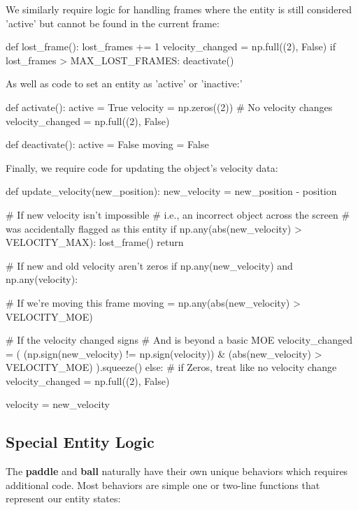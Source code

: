 \documentclass{report}
\newcommand{\pad}{\textbf{paddle}\xspace}
\newcommand{\ball}{\textbf{ball}\xspace}
\begin{document}
We similarly require logic for handling frames where the entity is still considered 'active' but cannot be found in the current frame:

\begin{codeblock}
def lost_frame():
    lost_frames += 1
    velocity_changed = np.full((2), False)
    if lost_frames > MAX_LOST_FRAMES:
        deactivate()    
\end{codeblock}

As well as code to set an entity as 'active' or 'inactive:'

\begin{codeblock}
 def activate():
    active = True
    velocity = np.zeros((2))
    # No velocity changes
    velocity_changed = np.full((2), False)   
\end{codeblock}

\begin{codeblock}
def deactivate():
    active = False
    moving = False    
\end{codeblock}

Finally, we require code for updating the object's velocity data:

\begin{codeblock}
def update_velocity(new_position):
    new_velocity = new_position - position

    # If new velocity isn't impossible
    # i.e., an incorrect object across the screen
    # was accidentally flagged as this entity
    if np.any(abs(new_velocity) > VELOCITY_MAX):
        lost_frame()
        return

    # If new and old velocity aren't zeros
    if np.any(new_velocity) and np.any(velocity):

        # If we're moving this frame
        moving = np.any(abs(new_velocity) > VELOCITY_MOE)

        # If the velocity changed signs
        # And is beyond a basic MOE
        velocity_changed = (
            (np.sign(new_velocity) != np.sign(velocity))
            & (abs(new_velocity) > VELOCITY_MOE)
        ).squeeze()
    else:  # if Zeros, treat like no velocity change
        velocity_changed = np.full((2), False)

    velocity = new_velocity
\end{codeblock}

\subsection{Special Entity Logic}
The \pad and \ball naturally have their own unique behaviors which requires additional code. Most behaviors are simple one or two-line functions that represent our entity states:
\end{document}
